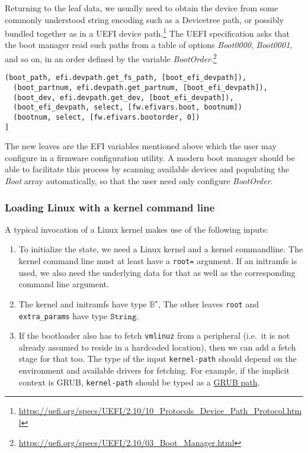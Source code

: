 Returning to the leaf data, we usually need to obtain the device from some commonly understood string encoding such as a Devicetree path, or possibly bundled together as in a UEFI device path.\footnote{\url{https://uefi.org/specs/UEFI/2.10/10_Protocols_Device_Path_Protocol.html}}
%
The UEFI specification asks that the boot manager read such paths from a table of options \emph{Boot0000}, \emph{Boot0001}, and so on, in an order defined by the variable \emph{BootOrder}.\footnote{\url{https://uefi.org/specs/UEFI/2.10/03_Boot_Manager.html}}
%
\begin{lstlisting}[firstnumber=30]
  (boot_path, efi.devpath.get_fs_path, [boot_efi_devpath]),
  (boot_partnum, efi.devpath.get_partnum, [boot_efi_devpath]),
  (boot_dev, efi.devpath.get_dev, [boot_efi_devpath]),
  (boot_efi_devpath, select, [fw.efivars.boot, bootnum])
  (bootnum, select, [fw.efivars.bootorder, 0])
]
\end{lstlisting}
%
The new leaves are the EFI variables mentioned above which the user may configure in a firmware configuration utility.
%
A modern boot manager should be able to facilitate this process by scanning available devices and populating the \emph{Boot} array automatically, so that the user need only configure \emph{BootOrder}.


\subsubsection{Loading Linux with a kernel command line}

A typical invocation of a Linux kernel makes use of the following inputs:
%
\begin{enumerate}
\item
  To initialize the state, we need a Linux kernel and a kernel commandline. 
  The kernel command line must at least have a \texttt{root=} argument. 
  If an initramfs is used, we also need the underlying data for that as well as the corresponding command line argument. 
\item
  The kernel and initramfs have type \(\mathbb{B}^\star\),
  The other leaves \texttt{root} and \texttt{extra\_params} have type \(\mathtt{String}\).
\item
  If the bootloader also has to fetch \texttt{vmlinuz} from a peripheral
  (i.e.~it is not already assumed to reside in a hardcoded location),
  then we can add a fetch stage for that too. The type of the input
  \texttt{kernel-path} should depend on the environment and available
  drivers for fetching. For example, if the implicit context is GRUB,
  \texttt{kernel-path} should be typed as a
  \href{https://www.gnu.org/software/grub/manual/grub/grub.html\#Naming-convention}{GRUB
  path}.
\end{enumerate}

